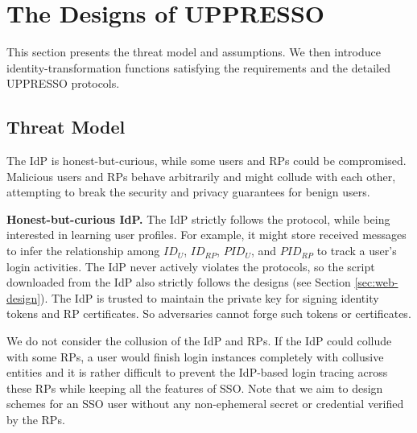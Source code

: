 
\section{The Designs of UPPRESSO}
\label{sec:UPPRESSO}

This section presents the threat model and assumptions.
We then introduce identity-transformation functions satisfying the requirements
    and the detailed UPPRESSO protocols.


\subsection{Threat Model}
The IdP is honest-but-curious,
 while some users and RPs could be compromised. %
Malicious users and RPs behave arbitrarily and might collude with each other,
 attempting to break the security and privacy guarantees for benign users.


\vspace{0.5mm}
\noindent \textbf{Honest-but-curious IdP.}
The IdP strictly follows the protocol, while being interested in learning user profiles.
For example, it might store received messages
 to infer the relationship among $ID_U$, $ID_{RP}$, $PID_{U}$, and $PID_{RP}$ to track a user's login activities.
The IdP never actively violates the protocols,
so the script downloaded from the IdP also strictly follows the designs (see Section \ref{sec:web-design}).
The IdP is trusted to maintain the private key for signing identity tokens and RP certificates. %
So adversaries cannot forge such tokens or certificates.

We do not consider the collusion of the IdP and RPs.
    If the IdP could collude with some RPs,
        a user would finish login instances completely with collusive entities
        and it is rather difficult to prevent the IdP-based login tracing across these RPs
            while keeping all the features of SSO.
Note that we aim to design schemes for an SSO user without any non-ephemeral secret or credential verified by the RPs.


